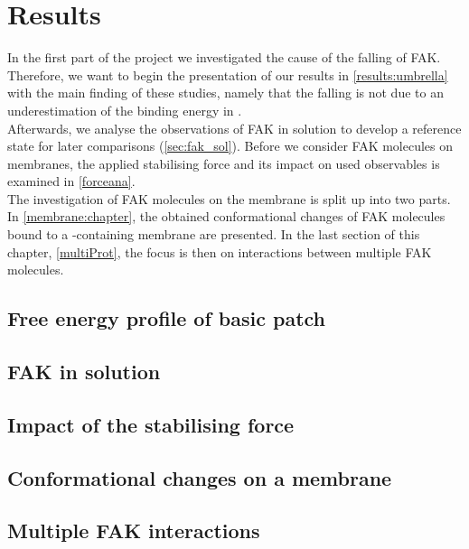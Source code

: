 \chapter{Results}
In the first part of the project we investigated the cause of the falling of FAK. Therefore, we want to begin the presentation of our results in \autoref{results:umbrella} with the main finding of these studies, namely that the falling is not due to an underestimation of the binding energy in \martini{}.\\
Afterwards, we analyse the observations of FAK in solution to develop a reference state for later comparisons (\autoref{sec:fak_sol}). Before we consider FAK molecules on membranes, the applied stabilising force and its impact on used observables is examined in \autoref{forceana}.\\
The investigation of FAK molecules on the membrane is split up into two parts. In \autoref{membrane:chapter}, the obtained conformational changes of FAK molecules bound to a \pip{}-containing membrane are presented. In the last section of this chapter, \autoref{multiProt}, the focus is then on interactions between multiple FAK molecules.
%
%
\section{Free energy profile of basic patch}

\clearpage
%
%
\section{FAK in solution}

\clearpage
%
%
\section{Impact of the stabilising force}

\clearpage
%
%
\section{Conformational changes on a membrane}

\clearpage
%
%
\section{Multiple FAK interactions}

